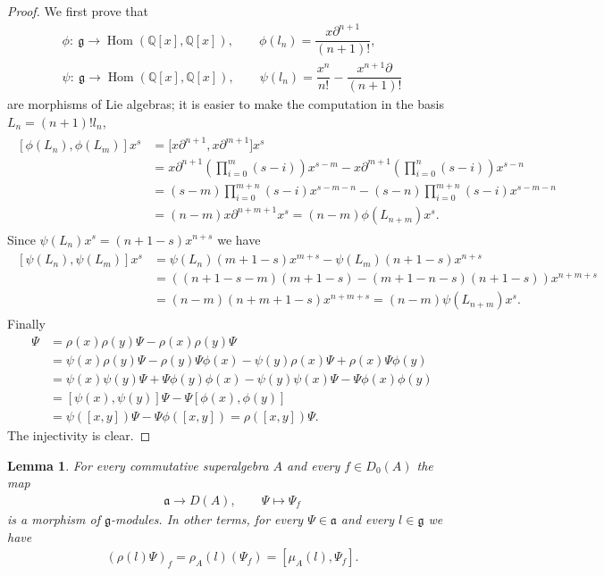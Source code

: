 \documentclass[pdftex]{sigma}
\newcommand{\Hom}{\operatorname{Hom}}
\newcommand{\Q}{\mathbb{Q}}
\numberwithin{equation}{section}
\newtheorem{Lemma}[Theorem]{Lemma}
 { \theoremstyle{definition}
\newtheorem{Definition}[Theorem]{Definition}
\newtheorem{Example}[Theorem]{Example}
\newtheorem{Remark}[Theorem]{Remark} }
\begin{document}
\begin{proof}We f\/irst prove that
\begin{gather*} \phi\colon \ \mathfrak{g}\to \Hom(\Q[x],\Q[x]),\qquad
\phi(l_n)= \dfrac{x\partial^{n+1}}{(n+1)!} ,\\
 \psi\colon \ \mathfrak{g}\to \Hom(\Q[x],\Q[x]),\qquad
\psi(l_n)=\dfrac{x^n}{n!}-\dfrac{x^{n+1}\partial}{(n+1)!} \end{gather*}
are morphisms of Lie algebras; it is easier to make the computation in the basis $L_n=(n+1)! l_n$,
\begin{gather*} \begin{split}
[\phi(L_n),\phi(L_m)]x^s&=\big[x\partial^{n+1},x\partial^{m+1}\big]x^s\\
&=x\partial^{n+1}\left(\prod_{i=0}^{m}(s-i)\right)x^{s-m}-x\partial^{m+1}\left(\prod_{i=0}^{n}(s-i)\right)x^{s-n}\\
&=(s-m)\prod_{i=0}^{m+n}(s-i)x^{s-m-n}-(s-n)\prod_{i=0}^{m+n}(s-i)x^{s-m-n}\\
&=(n-m)x\partial^{n+m+1}x^s=(n-m)\phi(L_{n+m})x^s.\end{split}\end{gather*}
Since $\psi(L_n)x^s=(n+1-s)x^{n+s}$ we have
\begin{gather*}\begin{split}
[\psi(L_n),\psi(L_m)]x^s&=\psi(L_n)(m+1-s)x^{m+s}-\psi(L_m)(n+1-s)x^{n+s}\\
&=((n+1-s-m)(m+1-s)-(m+1-n-s)(n+1-s))x^{n+m+s}\\
&=(n-m)(n+m+1-s)x^{n+m+s}=(n-m)\psi(L_{n+m})x^s.\end{split}\end{gather*}
Finally
\begin{align*}
[\rho(x),\rho(y)]\Psi&=\rho(x)\rho(y)\Psi-\rho(x)\rho(y)\Psi\\
&=\psi(x)\rho(y)\Psi-\rho(y)\Psi\phi(x)-
\psi(y)\rho(x)\Psi+\rho(x)\Psi\phi(y)\\
&=\psi(x) \psi(y)\Psi+\Psi\phi(y)\phi(x)
-\psi(y)\psi(x)\Psi-\Psi\phi(x)\phi(y)\\
&=[\psi(x),\psi(y)]\Psi-\Psi[\phi(x),\phi(y)]\\
&=\psi([x,y])\Psi-\Psi\phi([x,y])=\rho([x,y])\Psi .
\end{align*}
The injectivity is clear.
\end{proof}

\begin{Lemma} For every commutative superalgebra $A$ and every $f\in D_0(A)$ the map
\begin{gather*} \mathfrak{a}\to D(A),\qquad \Psi\mapsto \Psi_f\end{gather*}
is a morphism of $\mathfrak{g}$-modules. In other terms, for every $\Psi\in \mathfrak{a}$ and every $l\in \mathfrak{g}$ we have
\begin{gather}\label{equ.morfismogmoduli}
(\rho(l)\Psi)_f=\rho_A(l)(\Psi_f)=[\mu_A(l),\Psi_f] .
\end{gather}
\end{Lemma}
\end{document}
